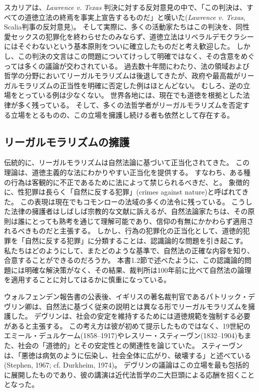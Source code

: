 \documentclass[paper=a4,book,openany]{jlreq} \usepackage{mystyle}
\begin{document}
スカリアは、\emph{Lawrence v. Texas} 判決に対する反対意見の中で、「この判決は、すべての道徳立法の終焉を事実上宣告するものだ」と嘆いた(\emph{Lawrence v. Texas}, Scalia判事の反対意見)。
そして実際に、多くの活動家たちはこの判決を、同性愛セックスの犯罪化を終わらせたのみならず、道徳立法はリベラルデモクラシーにはそぐわないという基本原則をついに確立したものだと考え歓迎した。
しかし、この判決の文言はこの問題についてけっして明確ではなく、その含意をめぐっては多くの議論が交わされている。
過去数十年間にわたり、法の領域および哲学の分野においてリーガルモラリズムは後退してきたが、政府や最高裁がリーガルモラリズムの正当性を明確に否定した例はほとんどない。
むしろ、逆の立場をとっている例は少なくない。
世界各地には、現在でも道徳を根拠とした法律が多く残っている。
そして、多くの法哲学者がリーガルモラリズムを否定する立場をとるものの、この立場を擁護し続ける者も依然として存在する。

\subsection{リーガルモラリズムの擁護}

伝統的に、リーガルモラリズムは自然法論に基づいて正当化されてきた。
この理論は、道徳主義的な法にわかりやすい正当化を提供する。
すなわち、ある種の行為は客観的に不正であるために法によって禁じられるべきだ、と。
象徴的に、性犯罪は長らく「自然に反する犯罪」(crimes against nature)と呼ばれてきた。
この表現は現在でもコモンローの法域の多くの法令に残っている。
こうした法律の擁護者はしばしば宗教的な文献に訴えるが、自然法論家たちは、その原則は誰にとっても熟考を通じて理解可能であり、信仰の有無にかかわらず適用されるべきものだと主張する。
しかし、行為の犯罪化の正当化として、道徳的犯罪を「自然に反する犯罪」に分類することは、認識論的な問題を引き起こす。
私たちはどのようにして、またどのような基準で、自然法の正確な内容を知り、合意することができるのだろうか。
本書1.2節で述べたように、この認識論的問題には明確な解決策がなく、その結果、裁判所は100年前に比べて自然法の論理を適用することに対してはるかに慎重になっている。

ウォルフェンデン報告書の公表後、イギリスの著名裁判官であるパトリック・デヴリン卿は、自然法に基づく従来の説明とは異なる形でリーガルモラリズムを擁護した。
デヴリンは、社会の安定を維持するためには道徳規範を強制する必要があると主張する。
この考え方は彼が初めて提示したものではなく、19世紀のエミール・デュルケーム(1858--1917)やレスリー・スティーヴン(1832--1904)もまた、社会の「道徳的」とその安定性との関連性を論じていた。
スティーヴンは、「悪徳は病気のように伝染し、社会全体に広がり、破壊する」と述べている(Stephen, 1967; cf. Durkheim, 1974)。
\nocite{stephen67:liberty}\nocite{durkheim74:sociology}
デヴリンの議論はこの立場を最も包括的に展開したものであり、彼の講演は近代法哲学の二大巨頭による応酬を招くこととなった。
\end{document}
